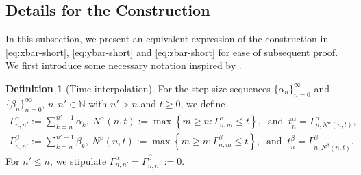 \documentclass[11pt]{article}
\theoremstyle{plain}
\theoremstyle{definition}
\newtheorem{defn}{Definition}[section]
\def\NB{{\mathbb N}}
\newcommand{\ssum}[3]{\sum\limits_{{#1}={#2}}^{#3}}
\begin{document}
\begin{appendix}
\subsection{Details for the Construction}\label{append:construct-details}
In this subsection, we present an equivalent expression of the construction in \eqref{eq:xbar-short}, \eqref{eq:ybar-short} and \eqref{eq:zbar-short} for ease of subsequent proof.
We first introduce some necessary notation inspired by \cite{gadat2018stochastic, liang2023asymptotic}.
\begin{defn}[Time interpolation]\label{defn:time-inter}
For the step size sequences $\{ \alpha_{n} \}_{n=0}^\infty$ and $\{ \beta_{n} \}_{n=0}^\infty$, $n, n' \in \NB$ with $n' > n$ and $t \ge 0$, we define
\begin{align*}
    \Gamma^\alpha_{n, n'} := \ssum{k}{n}{n'-1} \alpha_{k},\ 
    N^\alpha(n, t) := \max \left\{ m \ge n \colon \Gamma^\alpha_{n, m} \le t \right\}, 
    \ \text{ and } \
    \underline{t}^\alpha_{n} = \Gamma^\alpha_{n, N^\alpha(n,t)} 
    , \\
    \Gamma^\beta_{n, n'} := \ssum{k}{n}{n'-1} \beta_{k}, \ N^\beta(n, t) := \max \left\{ m \ge n \colon \Gamma^\beta_{n,m} \le t \right\}, \ 
    \text{ and } \
    \underline{t}^\beta_{n} = \Gamma^\beta_{n, N^\beta(n,t)}.
\end{align*}
For $n' \le n$, we stipulate $\Gamma^\alpha_{n,n'} = \Gamma^\beta_{n,n'}  := 0 $.
\end{defn}


\end{appendix}
\end{document}
